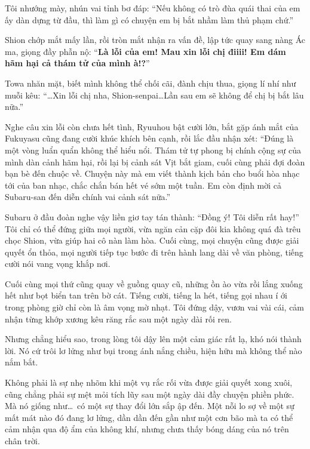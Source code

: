 \documentclass[../main.tex]{subfiles}
\begin{document}
Tôi nhướng mày, nhún vai tỉnh bơ đáp: ``Nếu không có trò đùa quái thai của em ấy dàn dựng từ đầu, thì làm gì có chuyện em bị bắt nhầm làm thủ phạm chứ.''

Shion chớp mắt mấy lần, rồi tròn mắt nhận ra vấn đề, lập tức quay sang nàng Ác ma, giọng đầy phẫn nộ: ``\textbf{Là lỗi của em! Mau xin lỗi chị điiii! Em dám hãm hại cả thám tử của mình à!?}''

Towa nhăn mặt, biết mình không thể chối cãi, đành chịu thua, giọng lí nhí như muỗi kêu: ``\dots Xin lỗi chị nha, Shion-senpai\dots Lần sau em sẽ không để chị bị bắt lâu nữa.''

Nghe câu xin lỗi còn chưa hết tình, Ryuuhou bật cười lớn, bắt gặp ánh mắt của Fukuyasu cũng đang cười khúc khích bên cạnh, rồi lắc đầu nhận xét: ``Đúng là một vòng luẩn quẩn không thể hiểu nổi. Thám tử tự phong bị chính cộng sự của mình dàn cảnh hãm hại, rồi lại bị cảnh sát Vịt bắt giam, cuối cùng phải đợi đoàn bạn bè đến chuộc về. Chuyện này mà em viết thành kịch bản cho buổi hòa nhạc tới của ban nhạc, chắc chắn bán hết vé sớm một tuần. Em còn định mời cả Subaru-san đến diễn chính vai cảnh sát nữa.''

Subaru ở đầu đoàn nghe vậy liền giơ tay tán thành: ``Đồng ý! Tôi diễn rất hay!'' Tôi chỉ có thể đứng giữa mọi người, vừa ngăn cản cặp đôi kia không quá đà trêu chọc Shion, vừa giúp hai cô nàn làm hòa. Cuối cùng, mọi chuyện cũng được giải quyết ổn thỏa, mọi người tiếp tục bước đi trên hành lang dài về văn phòng, tiếng cười nói vang vọng khắp nơi.

\il

Cuối cùng mọi thứ cũng quay về guồng quay cũ, những ồn ào vừa rồi lắng xuống hết như bọt biển tan trên bờ cát. Tiếng cười, tiếng la hét, tiếng gọi nhau í ới trong phòng giờ chỉ còn là âm vọng mờ nhạt. Tôi đứng dậy, vươn vai vài cái, cảm nhận từng khớp xương kêu răng rắc sau một ngày dài rối ren.

Nhưng chẳng hiểu sao, trong lòng tôi dậy lên một cảm giác rất lạ, khó nói thành lời. Nó cứ trôi lơ lửng như bụi trong ánh nắng chiều, hiện hữu mà không thể nào nắm bắt.

Không phải là sự nhẹ nhõm khi một vụ rắc rối vừa được giải quyết xong xuôi, cũng chẳng phải sự mệt mỏi tích lũy sau một ngày dài đầy chuyện phiền phức. Mà nó giống như\dots\ có một sự thay đổi lớn sắp ập đến. Một nỗi lo sợ về một sự mất mát nào đó đang lơ lửng, dần dần đến gần như một cơn bão mà ta có thể cảm nhận qua độ ẩm của không khí, nhưng chưa thấy bóng dáng của nó trên chân trời.
\end{document}
